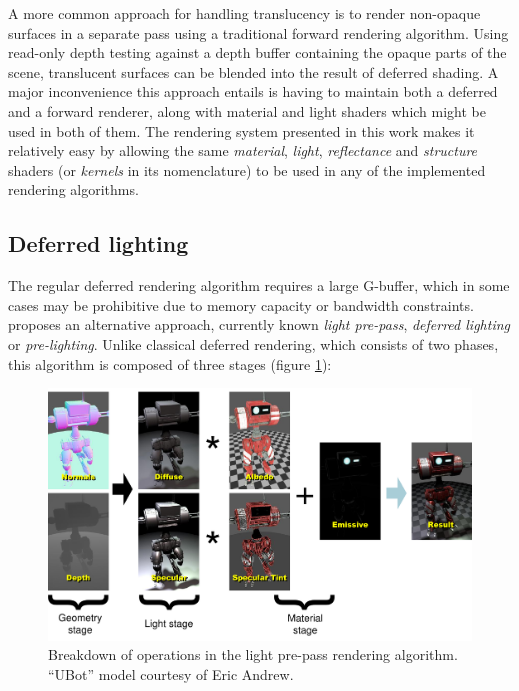A more common approach for handling translucency is to render non-opaque surfaces in a separate pass using a traditional forward rendering algorithm. Using read-only depth testing against a depth buffer containing the opaque parts of the scene, translucent surfaces can be blended into the result of deferred shading. A major inconvenience this approach entails is having to maintain both a deferred and a forward renderer, along with material and light shaders which might be used in both of them. The rendering system presented in this work makes it relatively easy by allowing the same \emph{material}, \emph{light}, \emph{reflectance} and \emph{structure} shaders (or \emph{kernels} in its nomenclature) to be used in any of the implemented rendering algorithms.

\subsection{Deferred lighting}
\label{sec:DeferredLighting}

The regular deferred rendering algorithm requires a large G-buffer, which in some cases may be prohibitive due to memory capacity or bandwidth constraints. \citet{Engel08PrePass} proposes an alternative approach, currently known \emph{light pre-pass}, \emph{deferred lighting} or \emph{pre-lighting}. Unlike classical deferred rendering, which consists of two phases, this algorithm is composed of three stages (figure \ref{fig:LightPrePassComposition}):

\begin{figure}[h!]
  \centering
    \includegraphics[width=0.9\linewidth]{./Figures/deferredComposition/lightPrePassComposition.pdf}
    \caption[Light pre-pass pipeline]{Breakdown of operations in the light pre-pass rendering algorithm. ``UBot'' model courtesy of Eric Andrew.}
  \label{fig:LightPrePassComposition}
\end{figure}

